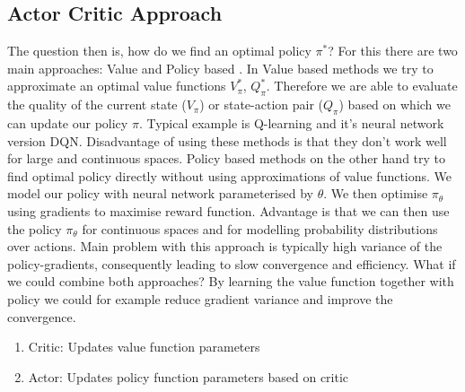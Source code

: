 \documentclass{article}
\begin{document}
\subsection{Actor Critic Approach}
The question then is, how do we find an optimal policy $\pi^*$? For this there are two main approaches: Value and Policy based \cite{sutton2018reinforcement}.
In Value based methods we try to approximate an optimal value functions $V_\pi^*$, $Q_\pi^*$. Therefore we are able to evaluate the quality of the current state ($V_\pi$) or state-action pair ($Q_\pi$) based on which we can update our policy $\pi$. Typical example is Q-learning and it's neural network version DQN. Disadvantage of using these methods is that they don't work well for large and continuous spaces.
\newline
Policy based methods on the other hand try to find optimal policy directly without using approximations of value functions. We model our policy with neural network parameterised by $\theta$. We then optimise $\pi_\theta$ using gradients to maximise reward function. Advantage is that we can then use the policy $\pi_\theta$ for continuous spaces and for modelling probability distributions over actions. Main problem with this approach is typically high variance of the policy-gradients, consequently leading to slow convergence and efficiency.
\newline
What if we could combine both approaches? By learning the value function together with policy we could for example reduce gradient variance and improve the convergence.
\begin{enumerate}
    \item Critic: Updates value function parameters
    \item Actor: Updates policy function parameters based on critic
\end{enumerate}
\end{document}
